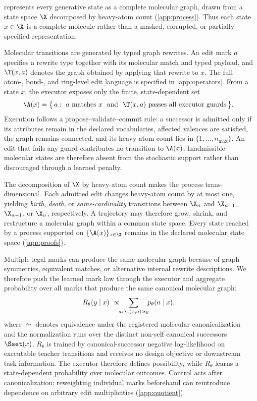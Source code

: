 \method{} represents every generative state as a complete molecular graph, drawn from a state space $\X$ decomposed by heavy-atom count (\cref{app:process}). Thus each state $x\in\X$ is a complete molecule rather than a masked, corrupted, or partially specified representation.

Molecular transitions are generated by typed graph rewrites. An edit mark $a$ specifies a rewrite type together with its molecular match and typed payload, and $\T(x,a)$ denotes the graph obtained by applying that rewrite to $x$. The full atom-, bond-, and ring-level edit language is specified in \cref{app:operators}. From a state $x$, the executor exposes only the finite, state-dependent set
\begin{equation}
\A(x)=\bigl\{\,a:\ a\ \text{matches}\ x\ \ \text{and}\ \ \T(x,a)\ \text{passes all executor guards}\,\bigr\}.
\label{eq:gem-editset}
\end{equation}
Execution follows a propose--validate--commit rule: a successor is admitted only if its attributes remain in the declared vocabularies, affected valences are satisfied, the graph remains connected, and its heavy-atom count lies in $\{1,\dots,n_{\max}\}$. An edit that fails any guard contributes no transition to $\A(x)$. Inadmissible molecular states are therefore absent from the stochastic support rather than discouraged through a learned penalty.

The decomposition of $\X$ by heavy-atom count makes the process trans-dimensional. Each admitted edit changes heavy-atom count by at most one, yielding \emph{birth}, \emph{death}, or \emph{same-cardinality} transitions between $\X_n$ and $\X_{n+1}$, $\X_{n-1}$, or $\X_n$, respectively. A trajectory may therefore grow, shrink, and restructure a molecular graph within a common state space. Every state reached by a process supported on $\{\A(x)\}_{x\in\X}$ remains in the declared molecular state space (\cref{app:proofs}).

Multiple legal marks can produce the same molecular graph because of graph symmetries, equivalent matches, or alternative internal rewrite descriptions. We therefore push the learned mark law through the executor and aggregate probability over all marks that produce the same canonical molecular graph:
\begin{equation}
R_\theta(y\mid x)\ \propto\!\!\sum_{a:\,\T(x,a)\simeq y}\!\! p_\theta(a\mid x),
\label{eq:gem-rtheta}
\end{equation}
where $\simeq$ denotes equivalence under the registered molecular canonicalization and the normalization runs over the distinct non-self canonical successors $\Sset(x)$. $R_\theta$ is trained by canonical-successor negative log-likelihood on executable teacher transitions and receives no design objective or downstream task information. The executor therefore defines possibility, while $R_\theta$ learns a state-dependent probability over molecular outcomes. Control acts after canonicalization; reweighting individual marks beforehand can reintroduce dependence on arbitrary edit multiplicities (\cref{app:quotient}).

